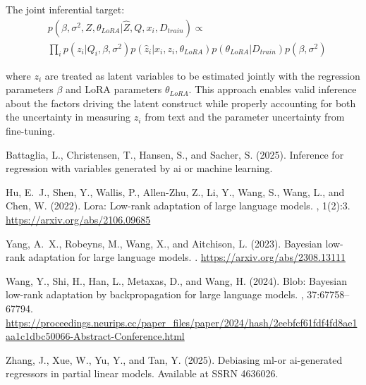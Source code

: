 \documentclass[11pt]{article}
\begin{document}
The joint inferential target:
\begin{align}
&p(\beta, \sigma^2, Z, \theta_{LoRA}|\hat{Z}, Q, x_i, D_{train}) \propto \label{eq:joint_target2} \\
&\prod_i p(z_i|Q_i, \beta, \sigma^2)p(\hat{z}_i|x_i, z_i, \theta_{LoRA})p(\theta_{LoRA}|D_{train})p(\beta, \sigma^2) \nonumber
\end{align}

where $z_i$ are treated as latent variables to be estimated jointly with the regression parameters $\beta$ and LoRA parameters $\theta_{LoRA}$. This approach enables valid inference about the factors driving the latent construct while properly accounting for both the uncertainty in measuring $z_i$ from text and the parameter uncertainty from fine-tuning.

\newpage

\begin{thebibliography}{99}

Battaglia, L., Christensen, T., Hansen, S., and Sacher, S. (2025).
\newblock Inference for regression with variables generated by ai or machine learning.

Hu, E.~J., Shen, Y., Wallis, P., Allen-Zhu, Z., Li, Y., Wang, S., Wang, L., and Chen, W. (2022).
\newblock Lora: Low-rank adaptation of large language models.
, 1(2):3.
\newblock \url{https://arxiv.org/abs/2106.09685}

Yang, A.~X., Robeyns, M., Wang, X., and Aitchison, L. (2023).
\newblock Bayesian low-rank adaptation for large language models.
.
\newblock \url{https://arxiv.org/abs/2308.13111}

Wang, Y., Shi, H., Han, L., Metaxas, D., and Wang, H. (2024).
\newblock Blob: Bayesian low-rank adaptation by backpropagation for large language models.
, 37:67758--67794.
\newblock \url{https://proceedings.neurips.cc/paper_files/paper/2024/hash/2eebfcf61fdf4fd8ae1aa1c1dbc50066-Abstract-Conference.html}

Zhang, J., Xue, W., Yu, Y., and Tan, Y. (2025).
\newblock Debiasing ml-or ai-generated regressors in partial linear models.
\newblock Available at SSRN 4636026.

\end{thebibliography}
\end{document}

